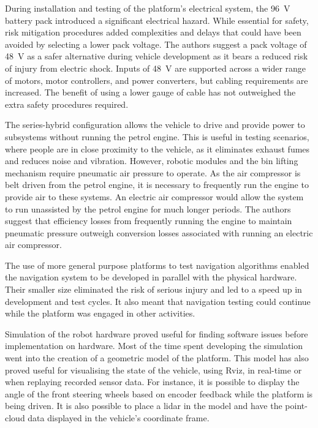 \documentclass[preprint,authoryear,12pt]{elsarticle}
\begin{document}
    During installation and testing of the platform's electrical system, the \SI{96}{\volt} battery pack introduced a significant electrical hazard.
    While essential for safety, risk mitigation procedures added complexities and delays that could have been avoided by selecting a lower pack voltage.
    The authors suggest a pack voltage of \SI{48}{\volt} as a safer alternative during vehicle development as it bears a reduced risk of injury from electric shock.
    Inputs of \SI{48}{\volt} are supported across a wider range of motors, motor controllers, and power converters, but cabling requirements are increased.
    The benefit of using a lower gauge of cable has not outweighed the extra safety procedures required.

    The series-hybrid configuration allows the vehicle to drive and provide power to subsystems without running the petrol engine.
    This is useful in testing scenarios, where people are in close proximity to the vehicle, as it eliminates exhaust fumes and reduces noise and vibration.
    However, robotic modules and the bin lifting mechanism require pneumatic air pressure to operate.
    As the air compressor is belt driven from the petrol engine, it is necessary to frequently run the engine to provide air to these systems.
    An electric air compressor would allow the system to run unassisted by the petrol engine for much longer periods.
    The authors suggest that efficiency losses from frequently running the engine to maintain pneumatic pressure outweigh conversion losses associated with running an electric air compressor.

    The use of more general purpose platforms to test navigation algorithms enabled the navigation system to be developed in parallel with the physical hardware.
    Their smaller size eliminated the risk of serious injury and led to a speed up in development and test cycles.
    It also meant that navigation testing could continue while the platform was engaged in other activities.

    Simulation of the robot hardware proved useful for finding software issues before implementation on hardware.
    Most of the time spent developing the simulation went into the creation of a geometric model of the platform.
    This model has also proved useful for visualising the state of the vehicle, using Rviz, in real-time or when replaying recorded sensor data.
    For instance, it is possible to display the angle of the front steering wheels based on encoder feedback while the platform is being driven.
    It is also possible to place a lidar in the model and have the point-cloud data displayed in the vehicle's coordinate frame.
\end{document}
